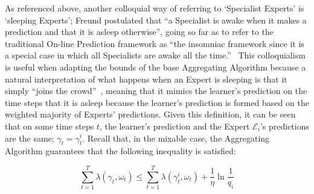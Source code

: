 As referenced above, another colloquial way of referring to `Specialist Experts' is `sleeping Experts'; Freund postulated that ``a Specialist is awake when it makes a prediction and that it is asleep otherwise'', going so far as to refer to the traditional On-line Prediction framework as ``the insomniac framework since it is a special case in which all Specialists are awake all the time.''~\cite{freund:1997} This colloquialism is useful when adapting the bounds of the base Aggregating Algorithm because a natural interpretation of what happens when an Expert is sleeping is that it simply ``joins the crowd''~\cite{kalnishkan:2022}, meaning that it mimics the learner's prediction on the time steps that it is asleep because the learner's prediction is formed based on the weighted majority of Experts' predictions. Given this definition, it can be seen that on some time steps $t$, the learner's prediction and the Expert $\mathcal{E}_i$'s predictions are the same; $\gamma_t = \gamma_t^i$.
Recall that, in the mixable case, the Aggregating Algorithm guarantees that the following inequality is satisfied:

\begin{equation}
    \overset{T}{\underset{t=1}{\sum}}\lambda(\gamma_t, \omega_t) \leq \overset{T}{\underset{t=1}{\sum}}\lambda(\gamma_t^i, \omega_t) + \frac{1}{\eta} \ln \frac{1}{q_i}
\end{equation}


